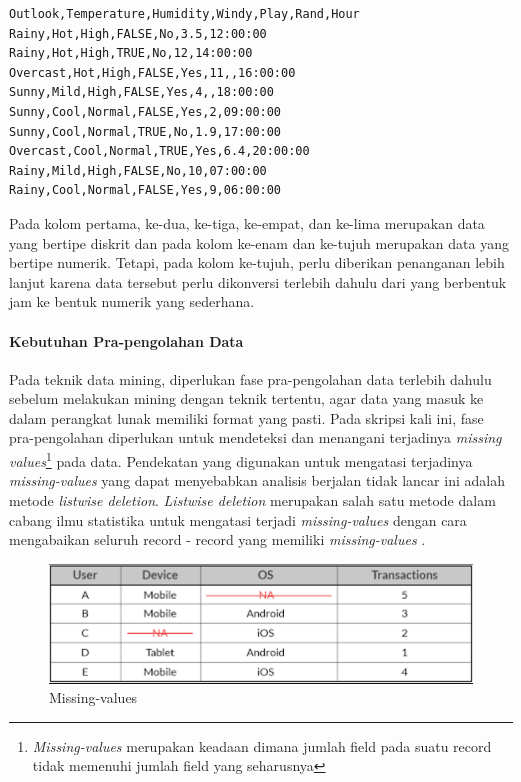 \begin{lstlisting}
Outlook,Temperature,Humidity,Windy,Play,Rand,Hour
Rainy,Hot,High,FALSE,No,3.5,12:00:00
Rainy,Hot,High,TRUE,No,12,14:00:00
Overcast,Hot,High,FALSE,Yes,11,,16:00:00
Sunny,Mild,High,FALSE,Yes,4,,18:00:00
Sunny,Cool,Normal,FALSE,Yes,2,09:00:00
Sunny,Cool,Normal,TRUE,No,1.9,17:00:00
Overcast,Cool,Normal,TRUE,Yes,6.4,20:00:00
Rainy,Mild,High,FALSE,No,10,07:00:00
Rainy,Cool,Normal,FALSE,Yes,9,06:00:00
\end{lstlisting}
Pada kolom pertama, ke-dua, ke-tiga, ke-empat, dan ke-lima merupakan data yang bertipe diskrit dan pada kolom ke-enam dan ke-tujuh merupakan data yang bertipe numerik. Tetapi, pada kolom ke-tujuh, perlu diberikan penanganan lebih lanjut karena data tersebut perlu dikonversi terlebih dahulu dari yang berbentuk jam ke bentuk numerik yang sederhana.

\paragraph{Kebutuhan Pra-pengolahan Data}

Pada teknik data mining, diperlukan fase pra-pengolahan data terlebih dahulu sebelum melakukan mining dengan teknik tertentu, agar data yang masuk ke dalam perangkat lunak memiliki format yang pasti. Pada skripsi kali ini, fase pra-pengolahan diperlukan untuk mendeteksi dan menangani terjadinya \textit{missing values}\footnote{\textit{Missing-values} merupakan keadaan dimana jumlah field pada suatu record tidak memenuhi jumlah field yang seharusnya} pada data. Pendekatan yang digunakan untuk mengatasi terjadinya \textit{missing-values} yang dapat menyebabkan analisis berjalan tidak lancar ini adalah metode \textit{listwise deletion}. \textit{Listwise deletion} merupakan salah satu metode dalam cabang ilmu statistika untuk mengatasi terjadi \textit{missing-values} dengan cara mengabaikan seluruh record - record yang memiliki \textit{missing-values} \cite{PeughMissing:2004}.

\begin{figure}[ht]
	\centering
	\includegraphics[scale=0.5]{GambarIO/Missing-values}
	\caption[Missing-values]{Missing-values \cite{MissingVal:2016}} 
	\label{fig:Missing-values}
\end{figure}

